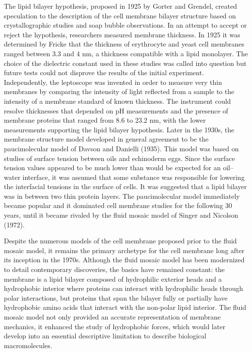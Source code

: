 \documentclass[
]{book}
\begin{document}
The lipid bilayer hypothesis, proposed in 1925 by Gorter and Grendel, created speculation to the description of the cell membrane bilayer structure based on crystallographic studies and soap bubble observations. In an attempt to accept or reject the hypothesis, researchers measured membrane thickness. In 1925 it was determined by Fricke that the thickness of erythrocyte and yeast cell membranes ranged between 3.3 and 4 nm, a thickness compatible with a lipid monolayer. The choice of the dielectric constant used in these studies was called into question but future tests could not disprove the results of the initial experiment. Independently, the leptoscope was invented in order to measure very thin membranes by comparing the intensity of light reflected from a sample to the intensity of a membrane standard of known thickness. The instrument could resolve thicknesses that depended on pH measurements and the presence of membrane proteins that ranged from 8.6 to 23.2 nm, with the lower measurements supporting the lipid bilayer hypothesis. Later in the 1930s, the membrane structure model developed in general agreement to be the paucimolecular model of Davson and Danielli (1935). This model was based on studies of surface tension between oils and echinoderm eggs. Since the surface tension values appeared to be much lower than would be expected for an oil--water interface, it was assumed that some substance was responsible for lowering the interfacial tensions in the surface of cells. It was suggested that a lipid bilayer was in between two thin protein layers. The paucimolecular model immediately became popular and it dominated cell membrane studies for the following 30 years, until it became rivaled by the fluid mosaic model of Singer and Nicolson (1972).

Despite the numerous models of the cell membrane proposed prior to the fluid mosaic model, it remains the primary archetype for the cell membrane long after its inception in the 1970s. Although the fluid mosaic model has been modernized to detail contemporary discoveries, the basics have remained constant: the membrane is a lipid bilayer composed of hydrophilic exterior heads and a hydrophobic interior where proteins can interact with hydrophilic heads through polar interactions, but proteins that span the bilayer fully or partially have hydrophobic amino acids that interact with the non-polar lipid interior. The fluid mosaic model not only provided an accurate representation of membrane mechanics, it enhanced the study of hydrophobic forces, which would later develop into an essential descriptive limitation to describe biological macromolecules.
\end{document}
